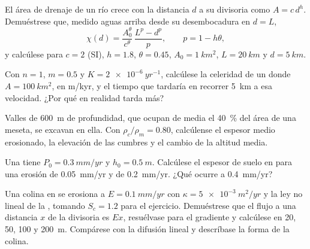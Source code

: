 \begin{exercise}[$\star\star$]\label{exo:b3:quantitative-geomorphology:6}
El área de drenaje de un río crece con la distancia $d$ a su divisoria como $A =
c\,d^{h}$. Demuéstrese que, medido aguas arriba desde su desembocadura en $d = L$,
\[
\chi(d) = \frac{A_0^{\theta}}{c^{\theta}}\,\frac{L^{p} - d^{p}}{p},
\qquad p = 1 - h\theta ,
\]
y calcúlese para $c = 2$ (SI), $h = 1.8$, $\theta = 0.45$, $A_0 =
\qty{1}{km^2}$, $L = \qty{20}{km}$ y $d = \qty{5}{km}$.
\end{exercise}

\begin{exercise}[$\star\star$]\label{exo:b3:quantitative-geomorphology:7}
Con $n = 1$, $m = 0.5$ y $K = \qty{2e-6}{yr^{-1}}$, calcúlese la
celeridad de un  donde $A = \qty{100}{km^2}$, en m/kyr, y el
tiempo que tardaría en recorrer \qty{5}{km} a esa velocidad. ¿Por qué
en realidad tarda más?
\end{exercise}

\begin{exercise}[$\star\star$]\label{exo:b3:quantitative-geomorphology:8}
Valles de \qty{600}{m} de profundidad, que ocupan de media el \qty{40}{\percent} del
área de una meseta, se excavan en ella. Con $\rho_c/\rho_m = 0.80$, calcúlense
el espesor medio erosionado, la elevación de las cumbres y el cambio de la
altitud media.
\end{exercise}

\begin{exercise}[$\star\star$]\label{exo:b3:quantitative-geomorphology:9}
Una  tiene $P_0 = \qty{0.3}{mm/yr}$ y $h_0 =
\qty{0.5}{m}$. Calcúlese el espesor de suelo en  para una erosión de
\qty{0.05}{mm/yr} y de \qty{0.2}{mm/yr}. ¿Qué ocurre a
\qty{0.4}{mm/yr}?
\end{exercise}

\begin{exercise}[$\star\star\star$]\label{exo:b3:quantitative-geomorphology:10}
Una colina en  se erosiona a $E = \qty{0.1}{mm/yr}$ con $\kappa =
\qty{5e-3}{m^2/yr}$ y la ley no lineal de la , tomando
$S_c = 1.2$ para el ejercicio. Demuéstrese que el flujo a una distancia $x$ de la
divisoria es $E x$, resuélvase para el gradiente y calcúlese en 20, 50, 100 y
\qty{200}{m}. Compárese con la difusión lineal y descríbase la forma de la
colina.
\end{exercise}

